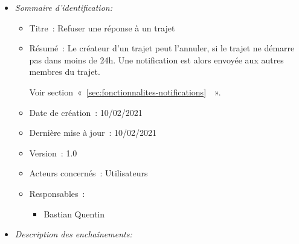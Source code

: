 \begin{itemize}

\item \textit{Sommaire d'identification:}

\begin{itemize}

\item Titre~: Refuser une réponse à un trajet

\item Résumé~: Le créateur d'un trajet peut l'annuler, si le trajet ne démarre pas dans moins de 24h.
Une notification est alors envoyée aux autres membres du trajet.

Voir section~«~\ref{sec:fonctionnalites-notifications}~~».

\item Date de création~: 10/02/2021

\item Dernière mise à jour~: 10/02/2021

\item Version~: 1.0

\item Acteurs concernés~: Utilisateurs

\item Responsables~:
\begin{itemize}
            \item Bastian Quentin
        \end{itemize}

\end{itemize}

\item \textit{Description des enchaînements:}


\end{itemize}

